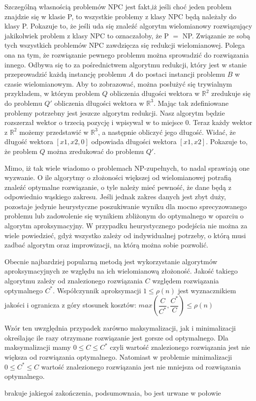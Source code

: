 Szczególną własnością problemów NPC jest fakt,iż jeśli choć jeden problem znajdzie się w klasie P, to wszystkie problemy z klasy NPC będą należały do klasy P. Pokazuje to, że jeśli uda się znaleźć algorytm wielomianowy rozwiązujący jakikolwiek problem z klasy NPC to oznaczałoby, że P $=$ NP. Związanie ze sobą tych wszystkich problemów NPC zawdzięcza się redukcji wielomianowej. Polega ona na tym, że rozwiązanie pewnego problemu można sprowadzić do rozwiązania innego. Odbywa się to za pośrednictwem algorytmu redukcji, który jest w stanie przeprowadzić każdą instancję problemu $A$ do postaci instancji problemu $B$ w czasie wielomianowym. Aby to zobrazować, można posłużyć się trywialnym przykładem, w którym problem $Q$ obliczenia długości wektora w $\mathbb{R}^{2}$ zredukuje się do problemu $Q'$ obliczenia długości wektora w $\mathbb{R}^{3}$. Mając tak zdefiniowane problemy potrzebny jest jeszcze algorytm redukcji. Nasz algorytm będzie rozszerzał wektor o trzecią pozycję i wpisywał w to miejsce $0$. Teraz każdy wektor z $\mathbb{R}^{2}$ możemy przedstawić w $\mathbb{R}^{3}$, a następnie obliczyć jego długość. Widać, że długość wektora $[x1,x2,0]$ odpowiada długości wektora $[x1,x2]$. Pokazuje to, że problem $Q$ można zredukować do problemu $Q'$.

Mimo, iż tak wiele wiadomo o problemach NP-zupełnych, to nadal sprawiają one wyzwanie. O ile algorytmy o złożoności większej od wielomianowej potrafią znaleźć optymalne rozwiązanie, o tyle należy mieć pewność, że dane będą z odpowiednio wąskiego zakresu. Jeśli jednak zakres danych jest zbyt duży, pozostaje jedynie heurystyczne poszukiwanie wyniku dla mocno sprecyzowanego problemu lub zadowolenie się wynikiem zbliżonym do optymalnego w oparciu o algorytm aproksymacyjny. W przypadku heurystycznego podejścia nie można za wiele powiedzieć, gdyż wszystko zależy od indywidualnej potrzeby, o którą musi zadbać algorytm  oraz improwizacji, na którą można sobie pozwolić.

Obecnie najbardziej popularną metodą jest wykorzystanie algorytmów aproksymacyjnych ze względu na ich wielomianową złożoność. Jakość takiego algorytmu zależy od znalezionego rozwiązania $C$ względem rozwiązania optymalnego $C^{*}$. Współczynnik aproksymacji $1 \leq \rho(n)$ jest wyznacznikiem jakości i ogranicza z góry stosunek kosztów: $max(\dfrac{C}{C^{*}},\dfrac{C^{*}}{C}) \leq \rho(n)$

Wzór ten uwzględnia przypadek zarówno maksymalizacji, jak i minimalizacji określając ile razy otrzymane rozwiązanie jest gorsze od optymalnego. Dla maksymalizacji mamy $0 \leq C \leq C^{*}$ czyli wartość znalezionego rozwiązania jest nie większa od rozwiązania optymalnego. Natomiast w problemie minimalizacji $0 \leq C^{*} \leq C$ wartość znalezionego rozwiązania jest nie mniejsza od rozwiązania optymalnego.

brakuje jakiegoś zakończenia, podsumownaia, bo jest urwane w połowie